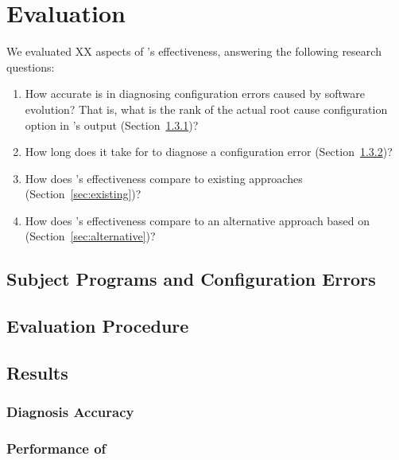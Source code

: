
\section{Evaluation}
\label{sec:evaluation}

We evaluated XX aspects of \ourtool's effectiveness, answering
the following research questions:

\begin{enumerate}
\item How accurate is \ourtool in diagnosing configuration errors
caused by software evolution? That is, what is the rank of the
actual root cause configuration option in \ourtool's output (Section~\ref{sec:accuracy})?

\item How long does it take for \ourtool to diagnose
a configuration error (Section~\ref{sec:timecost})?

\item How does \ourtool's effectiveness compare to
existing approaches (Section~\ref{sec:existing})?

\item How does \ourtool's effectiveness compare to
an alternative approach based on  (Section~\ref{sec:alternative})?

\end{enumerate}

\subsection{Subject Programs and Configuration Errors}


\subsection{Evaluation Procedure}

\subsection{Results}

\subsubsection{Diagnosis Accuracy}
\label{sec:accuracy}

\subsubsection{Performance of \ourtool}
\label{sec:timecost}

